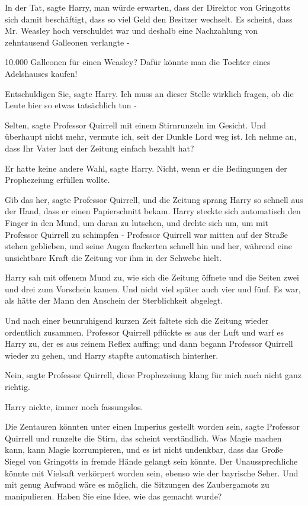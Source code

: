 \glqq{}In der Tat\grqq{}, sagte Harry, \glqq{}man würde erwarten, dass der
Direktor von Gringotts sich damit beschäftigt, dass so viel Geld den Besitzer
wechselt. Es scheint, dass Mr. Weasley hoch verschuldet war und deshalb eine
Nachzahlung von zehntausend Galleonen verlangte -\grqq{}

\glqq{}10.000 Galleonen für einen Weasley? Dafür könnte man die Tochter eines
Adelshauses kaufen!\grqq{}

\glqq{}Entschuldigen Sie\grqq{}, sagte Harry. \glqq{}Ich muss an dieser Stelle
wirklich fragen, ob die Leute hier so etwas tatsächlich tun -\grqq{}

\glqq{}Selten\grqq{}, sagte Professor Quirrell mit einem Stirnrunzeln im Gesicht.
\glqq{}Und überhaupt nicht mehr, vermute ich, seit der Dunkle Lord weg ist. Ich
nehme an, dass Ihr Vater laut der Zeitung einfach bezahlt hat?\grqq{}

\glqq{}Er hatte keine andere Wahl\grqq{}, sagte Harry. \glqq{}Nicht, wenn er die
Bedingungen der Prophezeiung erfüllen wollte.\grqq{}

\glqq{}Gib das her\grqq{}, sagte Professor Quirrell, und die Zeitung sprang Harry
so schnell aus der Hand, dass er einen Papierschnitt bekam. Harry steckte sich
automatisch den Finger in den Mund, um daran zu lutschen, und drehte sich um, um
mit Professor Quirrell zu schimpfen - Professor Quirrell war mitten auf der
Straße stehen geblieben, und seine Augen flackerten schnell hin und her, während
eine unsichtbare Kraft die Zeitung vor ihm in der Schwebe hielt.

Harry sah mit offenem Mund zu, wie sich die Zeitung öffnete und die Seiten zwei
und drei zum Vorschein kamen. Und nicht viel später auch vier und fünf. Es war,
als hätte der Mann den Anschein der Sterblichkeit abgelegt.

Und nach einer beunruhigend kurzen Zeit faltete sich die Zeitung wieder
ordentlich zusammen. Professor Quirrell pflückte es aus der Luft und warf es
Harry zu, der es aus reinem Reflex auffing; und dann begann Professor Quirrell
wieder zu gehen, und Harry stapfte automatisch hinterher.

\glqq{}Nein\grqq{}, sagte Professor Quirrell, \glqq{}diese Prophezeiung klang für
mich auch nicht ganz richtig.\grqq{}

Harry nickte, immer noch fassungslos.

\glqq{}Die Zentauren könnten unter einen Imperius gestellt worden sein\grqq{},
sagte Professor Quirrell und runzelte die Stirn, \glqq{}das scheint verständlich.
Was Magie machen kann, kann Magie korrumpieren, und es ist nicht undenkbar, dass
das Große Siegel von Gringotts in fremde Hände gelangt sein könnte. Der
Unaussprechliche könnte mit Vielsaft verkörpert worden sein, ebenso wie der
bayrische Seher. Und mit genug Aufwand wäre es möglich, die Sitzungen des
Zaubergamots zu manipulieren. Haben Sie eine Idee, wie das gemacht wurde?\grqq{}

